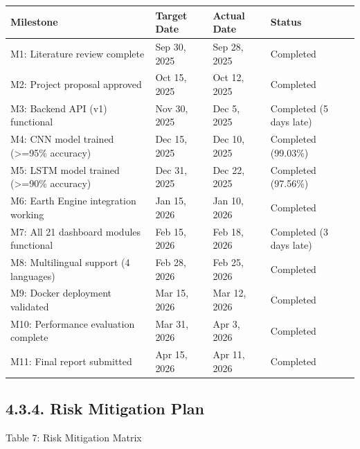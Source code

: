 \documentclass[12pt, a4paper]{report}
\begin{document}
\begin{table}[htbp]
\centering
\small
\begin{tabularx}{\textwidth}{|X|X|X|X|}
\hline
Milestone & Target Date & Actual Date & Status \\
\hline
M1: Literature review complete & Sep 30, 2025 & Sep 28, 2025 & Completed \\
M2: Project proposal approved & Oct 15, 2025 & Oct 12, 2025 & Completed \\
M3: Backend API (v1) functional & Nov 30, 2025 & Dec 5, 2025 & Completed (5 days late) \\
M4: CNN model trained (>=95\% accuracy) & Dec 15, 2025 & Dec 10, 2025 & Completed (99.03\%) \\
M5: LSTM model trained (>=90\% accuracy) & Dec 31, 2025 & Dec 22, 2025 & Completed (97.56\%) \\
M6: Earth Engine integration working & Jan 15, 2026 & Jan 10, 2026 & Completed \\
M7: All 21 dashboard modules functional & Feb 15, 2026 & Feb 18, 2026 & Completed (3 days late) \\
M8: Multilingual support (4 languages) & Feb 28, 2026 & Feb 25, 2026 & Completed \\
M9: Docker deployment validated & Mar 15, 2026 & Mar 12, 2026 & Completed \\
M10: Performance evaluation complete & Mar 31, 2026 & Apr 3, 2026 & Completed \\
M11: Final report submitted & Apr 15, 2026 & Apr 11, 2026 & Completed \\
\hline
\end{tabularx}
\end{table}

\subsection{4.3.4. Risk Mitigation Plan}
Table 7: Risk Mitigation Matrix
\end{document}
